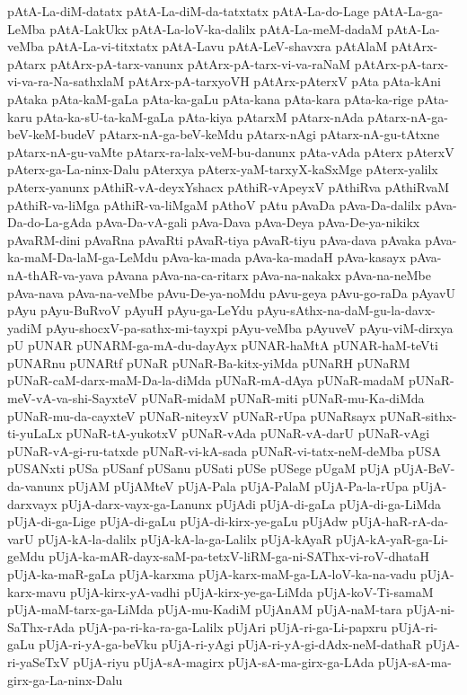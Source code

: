 {pAtA-La-diM-datatx
pAtA-La-diM-da-tatxtatx
pAtA-La-do-Lage
pAtA-La-ga-LeMba
pAtA-LakUkx
pAtA-La-loV-ka-dalilx
pAtA-La-meM-dadaM
pAtA-La-veMba
pAtA-La-vi-titxtatx
pAtA-Lavu
pAtA-LeV-shavxra
pAtAlaM
pAtArx-pAtarx
pAtArx-pA-tarx-vanunx
pAtArx-pA-tarx-vi-va-raNaM
pAtArx-pA-tarx-vi-va-ra-Na-sathxlaM
pAtArx-pA-tarxyoVH
pAtArx-pAterxV
pAta
pAta-kAni
pAtaka
pAta-kaM-gaLa
pAta-ka-gaLu
pAta-kana
pAta-kara
pAta-ka-rige
pAta-karu
pAta-ka-sU-ta-kaM-gaLa
pAta-kiya
pAtarxM
pAtarx-nAda
pAtarx-nA-ga-beV-keM-budeV
pAtarx-nA-ga-beV-keMdu
pAtarx-nAgi
pAtarx-nA-gu-tAtxne
pAtarx-nA-gu-vaMte
pAtarx-ra-lalx-veM-bu-danunx
pAta-vAda
pAterx
pAterxV
pAterx-ga-La-ninx-Dalu
pAterxya
pAterx-yaM-tarxyX-kaSxMge
pAterx-yalilx
pAterx-yanunx
pAthiR-vA-deyxYshacx
pAthiR-vApeyxV
pAthiRva
pAthiRvaM
pAthiR-va-liMga
pAthiR-va-liMgaM
pAthoV
pAtu
pAvaDa
pAva-Da-dalilx
pAva-Da-do-La-gAda
pAva-Da-vA-gali
pAva-Dava
pAva-Deya
pAva-De-ya-nikikx
pAvaRM-dini
pAvaRna
pAvaRti
pAvaR-tiya
pAvaR-tiyu
pAva-dava
pAvaka
pAva-ka-maM-Da-laM-ga-LeMdu
pAva-ka-mada
pAva-ka-madaH
pAva-kasayx
pAva-nA-thAR-va-yava
pAvana
pAva-na-ca-ritarx
pAva-na-nakakx
pAva-na-neMbe
pAva-nava
pAva-na-veMbe
pAvu-De-ya-noMdu
pAvu-geya
pAvu-go-raDa
pAyavU
pAyu
pAyu-BuRvoV
pAyuH
pAyu-ga-LeYdu
pAyu-sAthx-na-daM-gu-la-davx-yadiM
pAyu-shocxV-pa-sathx-mi-tayxpi
pAyu-veMba
pAyuveV
pAyu-viM-dirxya
pU
pUNAR
pUNARM-ga-mA-du-dayAyx
pUNAR-haMtA
pUNAR-haM-teVti
pUNARnu
pUNARtf
pUNaR
pUNaR-Ba-kitx-yiMda
pUNaRH
pUNaRM
pUNaR-caM-darx-maM-Da-la-diMda
pUNaR-mA-dAya
pUNaR-madaM
pUNaR-meV-vA-va-shi-SayxteV
pUNaR-midaM
pUNaR-miti
pUNaR-mu-Ka-diMda
pUNaR-mu-da-cayxteV
pUNaR-niteyxV
pUNaR-rUpa
pUNaRsayx
pUNaR-sithx-ti-yuLaLx
pUNaR-tA-yukotxV
pUNaR-vAda
pUNaR-vA-darU
pUNaR-vAgi
pUNaR-vA-gi-ru-tatxde
pUNaR-vi-kA-sada
pUNaR-vi-tatx-neM-deMba
pUSA
pUSANxti
pUSa
pUSanf
pUSanu
pUSati
pUSe
pUSege
pUgaM
pUjA
pUjA-BeV-da-vanunx
pUjAM
pUjAMteV
pUjA-Pala
pUjA-PalaM
pUjA-Pa-la-rUpa
pUjA-darxvayx
pUjA-darx-vayx-ga-Lanunx
pUjAdi
pUjA-di-gaLa
pUjA-di-ga-LiMda
pUjA-di-ga-Lige
pUjA-di-gaLu
pUjA-di-kirx-ye-gaLu
pUjAdw
pUjA-haR-rA-da-varU
pUjA-kA-la-dalilx
pUjA-kA-la-ga-Lalilx
pUjA-kAyaR
pUjA-kA-yaR-ga-Li-geMdu
pUjA-ka-mAR-dayx-saM-pa-tetxV-liRM-ga-ni-SAThx-vi-roV-dhataH
pUjA-ka-maR-gaLa
pUjA-karxma
pUjA-karx-maM-ga-LA-loV-ka-na-vadu
pUjA-karx-mavu
pUjA-kirx-yA-vadhi
pUjA-kirx-ye-ga-LiMda
pUjA-koV-Ti-samaM
pUjA-maM-tarx-ga-LiMda
pUjA-mu-KadiM
pUjAnAM
pUjA-naM-tara
pUjA-ni-SaThx-rAda
pUjA-pa-ri-ka-ra-ga-Lalilx
pUjAri
pUjA-ri-ga-Li-papxru
pUjA-ri-gaLu
pUjA-ri-yA-ga-beVku
pUjA-ri-yAgi
pUjA-ri-yA-gi-dAdx-neM-dathaR
pUjA-ri-yaSeTxV
pUjA-riyu
pUjA-sA-magirx
pUjA-sA-ma-girx-ga-LAda
pUjA-sA-ma-girx-ga-La-ninx-Dalu
}
